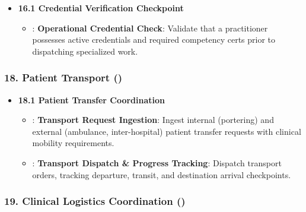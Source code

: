 \begin{itemize}

\item
\textbf{16.1 Credential Verification Checkpoint}


\begin{itemize}

\item
\texttt{}: \textbf{Operational Credential Check}: Validate that a practitioner possesses active credentials and required competency certs prior to dispatching specialized work.



\end{itemize}


\end{itemize}
\label{rad:enabling:543}
\subsubsection*{18. Patient Transport (\texttt{})}
\label{rad:enabling:544}

\begin{itemize}

\item
\textbf{18.1 Patient Transfer Coordination}


\begin{itemize}

\item
\texttt{}: \textbf{Transport Request Ingestion}: Ingest internal (portering) and external (ambulance, inter-hospital) patient transfer requests with clinical mobility requirements.



\item
\texttt{}: \textbf{Transport Dispatch \& Progress Tracking}: Dispatch transport orders, tracking departure, transit, and destination arrival checkpoints.



\end{itemize}


\end{itemize}
\label{rad:enabling:548}
\subsubsection*{19. Clinical Logistics Coordination (\texttt{})}
\label{rad:enabling:549}

